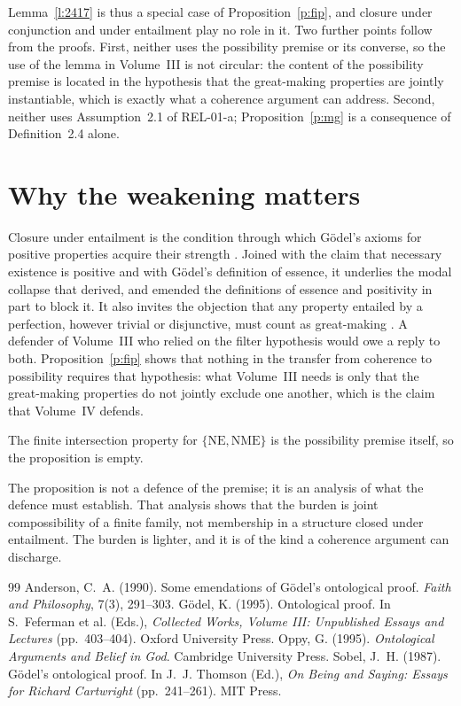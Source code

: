 \documentclass{situationist-preprint}
\begin{document}
Lemma~\ref{l:2417} is thus a special case of Proposition~\ref{p:fip}, and closure under conjunction and under entailment play no role in it. Two further points follow from the proofs. First, neither uses the possibility premise or its converse, so the use of the lemma in Volume~III is not circular: the content of the possibility premise is located in the hypothesis that the great-making properties are jointly instantiable, which is exactly what a coherence argument can address. Second, neither uses Assumption~2.1 of REL-01-a; Proposition~\ref{p:mg} is a consequence of Definition~2.4 alone.

\section{Why the weakening matters}

Closure under entailment is the condition through which Gödel's axioms for positive properties acquire their strength \citep{Godel1995}. Joined with the claim that necessary existence is positive and with Gödel's definition of essence, it underlies the modal collapse that \citet{Sobel1987} derived, and \citet{Anderson1990} emended the definitions of essence and positivity in part to block it. It also invites the objection that any property entailed by a perfection, however trivial or disjunctive, must count as great-making \citep{Oppy1995}. A defender of Volume~III who relied on the filter hypothesis would owe a reply to both. Proposition~\ref{p:fip} shows that nothing in the transfer from coherence to possibility requires that hypothesis: what Volume~III needs is only that the great-making properties do not jointly exclude one another, which is the claim that Volume~IV defends.

\begin{objection}
The finite intersection property for $\{\mathrm{NE}, \mathrm{NME}\}$ is the possibility premise itself, so the proposition is empty.
\end{objection}

\begin{reply}
The proposition is not a defence of the premise; it is an analysis of what the defence must establish. That analysis shows that the burden is joint compossibility of a finite family, not membership in a structure closed under entailment. The burden is lighter, and it is of the kind a coherence argument can discharge.
\end{reply}

\begin{thebibliography}{99}\small
{} Anderson, C.~A. (1990). Some emendations of Gödel's ontological proof. \emph{Faith and Philosophy}, 7(3), 291--303.
 Gödel, K. (1995). Ontological proof. In S.~Feferman et al. (Eds.), \emph{Collected Works, Volume III: Unpublished Essays and Lectures} (pp.~403--404). Oxford University Press.
 Oppy, G. (1995). \emph{Ontological Arguments and Belief in God}. Cambridge University Press.
 Sobel, J.~H. (1987). Gödel's ontological proof. In J.~J. Thomson (Ed.), \emph{On Being and Saying: Essays for Richard Cartwright} (pp.~241--261). MIT Press.
\end{thebibliography}
\end{document}
